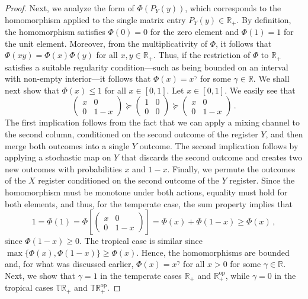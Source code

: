 \documentclass[aps,pra,11pt,onecolumn,nofootinbib,tightenlines]{revtex4-2}
\theoremstyle{definition}
\newcommand{\mb}[1]{\mathbb{#1}}
\begin{document}
\begin{proof}
Next, we analyze the form of $\Phi(P_Y(y))$, which corresponds to the homomorphism applied to the single matrix entry $P_Y(y) \in \mb R_+$.
By definition, the homomorphism satisfies $\Phi(0) = 0$ for the zero element and $\Phi(1) = 1$ for the unit element.
Moreover, from the multiplicativity of $\Phi$, it follows that $\Phi(xy)=\Phi(x)\Phi(y)$ for all $x,y\in\mb R_+$. Thus, if the restriction of $\Phi$ to $\mathbb{R}_+$ satisfies a suitable regularity condition—such as being bounded on an interval with non-empty interior—it follows that $\Phi(x) = x^\gamma$ for some $\gamma \in \mathbb{R}$.
 We shall next show that $\Phi(x)\leq 1$ for all $x\in[0,1]$. Let $x\in[0,1]$. We easily see that
\begin{equation}\label{eq:x1}
\left(\begin{array}{cc}
x&0\\
0&1-x
\end{array}\right)\succeq\left(\begin{array}{cc}
1&0\\
0&0
\end{array}\right)\succeq\left(\begin{array}{cc}
x&0\\
0&1-x
\end{array}\right) \,.
\end{equation}
The first implication follows from the fact that we can apply a mixing channel to the second column, conditioned on the second outcome of the register $Y$, and then merge both outcomes into a single $Y$ outcome. The second implication follows by applying a stochastic map on $Y$ that discards the second outcome and creates two new outcomes with probabilities $x$ and $1-x$. Finally, we permute the outcomes of the $X$ register conditioned on the second outcome of the $Y$ register. Since the homomorphism must be monotone under both actions, equality must hold for both elements, and thus, for the temperate case, the sum property implies that
\begin{equation}
1=\Phi(1)=\Phi\left[\left(\begin{array}{cc}
x&0\\
0&1-x
\end{array}\right)\right]=\Phi(x)+\Phi(1-x)\geq\Phi(x) \,,
\end{equation}
since $\Phi(1-x)\geq 0$. The tropical case is similar since $\max\{\Phi(x),\Phi(1-x)\} \geq \Phi(x)$. Hence, the homomorphisms are bounded and, for what was discussed earlier, $\Phi(x)=x^\gamma$ for all $x>0$ for some $\gamma\in\mb R$. Next, we show that $\gamma = 1$ in the temperate cases $\mathbb{R}_+$ and $\mathbb{R}^{\mathrm{op}}_+$, while $\gamma = 0$ in the tropical cases $\mathbb{TR}_+$ and $\mathbb{TR}^{\mathrm{op}}_+$.

\end{proof}
\end{document}
